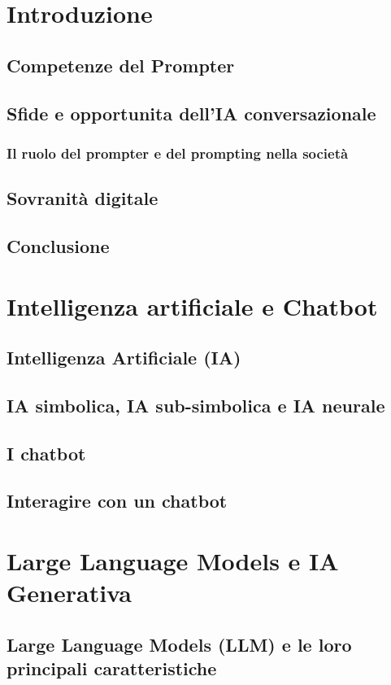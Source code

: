 \section{Introduzione}
    \subsection{Competenze del Prompter}
    \subsection{Sfide e opportunita dell’IA conversazionale}
        \subsubsection{Il ruolo del prompter e del prompting nella società}
    \subsection{Sovranità digitale}
    \subsection{Conclusione}
    
\section{Intelligenza artificiale e Chatbot}
    \subsection{Intelligenza Artificiale (IA)}
    \subsection{IA simbolica, IA sub-simbolica e IA neurale}
    \subsection{I chatbot}
    \subsection{Interagire con un chatbot}

\section{Large Language Models e IA Generativa}
    \subsection{Large Language Models (LLM) e le loro principali caratteristiche}

